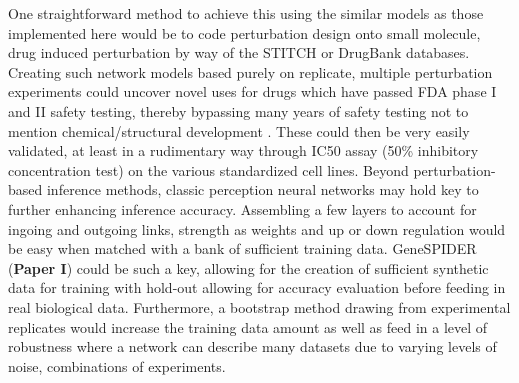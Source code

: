 One straightforward method to achieve this using the similar models as those implemented here would be to code perturbation design onto small molecule, drug induced perturbation by way of the STITCH  \citep{kuhn2009stitch} or DrugBank \citep{wishart2006drugbank} databases. Creating such network models based purely on replicate, multiple perturbation experiments could uncover novel uses for drugs which have passed FDA phase I and II safety testing, thereby bypassing many years of safety testing not to mention chemical/structural development \citep{oprea2011drug}. These could then be very easily validated, at least in a rudimentary way through IC50 assay (50\% inhibitory concentration test) on the various standardized cell lines.
Beyond perturbation-based inference methods, classic perception neural networks may hold key to further enhancing inference accuracy. Assembling a few layers to account for ingoing and outgoing links, strength as weights and up or down regulation would be easy when matched with a bank of sufficient training data. GeneSPIDER (\textbf{Paper I}) could be such a key, allowing for the creation of sufficient synthetic data for training with hold-out allowing for accuracy evaluation before feeding in real biological data. Furthermore, a bootstrap method drawing from experimental replicates would increase the training data amount as well as feed in a level of robustness where a network can describe many datasets due to varying levels of noise, combinations of experiments.

\noindent\hrulefill

